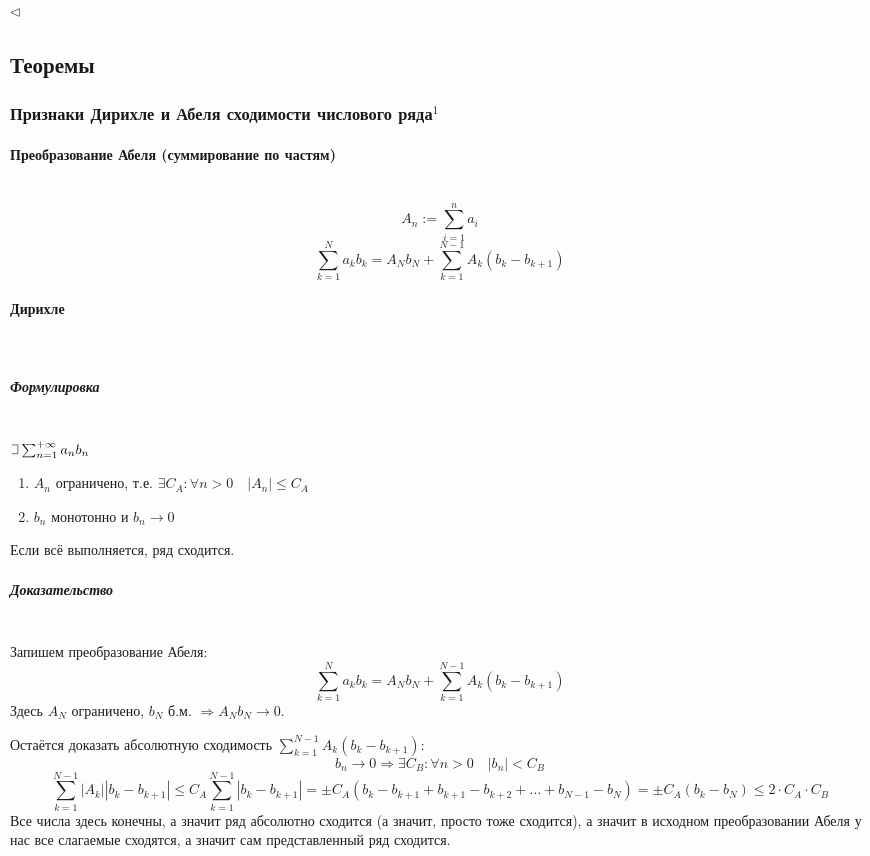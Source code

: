 \documentclass{article}
\def\letus{%
\mathord{\setbox0=\hbox{$\exists$}%
         \hbox{\kern 0.125\wd0%
               \vbox to \ht0{%
                  \hrule width 0.75\wd0%
                  \vfill%
                  \hrule width 0.75\wd0}%
               \vrule height \ht0%
               \kern 0.125\wd0}%
       }%
        }
\let\vanillaparagraph\paragraph
\let\vanillasubparagraph\subparagraph
\renewcommand{\paragraph}[1]{\vanillaparagraph{#1}\mbox{}\\}
\renewcommand{\subparagraph}[1]{\vanillasubparagraph{#1}\mbox{}\\}
\begin{document}
$\lhd$


\newpage
\subsection{Теоремы}

\subsubsection{Признаки Дирихле и Абеля сходимости числового ряда\texorpdfstring{$^1$}{}}
\paragraph{Преобразование Абеля (суммирование по частям)}
$$
A_n := \sum_{i=1}^n a_i
$$
$$
\sum_{k=1}^N a_k b_k = A_N b_N + \sum_{k=1}^{N-1} A_k (b_k - b_{k+1})
$$

\paragraph{Дирихле}
\subparagraph{Формулировка}
$\letus \sum_{n=1}^{+\infty} a_n b_n$
\begin{enumerate}
    \item $A_n$ ограничено, т.е. $\exists C_A : \forall n > 0 \quad |A_n| \le C_A$
    \item $b_n$ монотонно и $b_n \rightarrow 0$
\end{enumerate}
Если всё выполняется, ряд сходится. 

\subparagraph{Доказательство}
Запишем преобразование Абеля:
$$
\sum_{k=1}^N a_k b_k = A_N b_N + \sum_{k=1}^{N-1} A_k (b_k - b_{k+1})
$$
Здесь $A_N$ ограничено, $b_N$ б.м. $\Rightarrow A_N b_N \rightarrow 0$.

Остаётся доказать абсолютную сходимость $\sum_{k=1}^{N-1} A_k (b_k - b_{k+1})$:
$$
b_n \rightarrow 0 \Rightarrow \exists C_B : \forall n > 0 \quad |b_n| < C_B
$$
$$
\sum_{k=1}^{N-1} |A_k| |b_k - b_{k+1}| \le C_A \sum_{k=1}^{N-1} |b_k - b_{k+1}| = \pm C_A (b_k - b_{k+1} + b_{k+1} - b_{k+2} + \ldots + b_{N-1} - b_N) = \pm C_A (b_k - b_N) \le 2 \cdot C_A \cdot C_B
$$
Все числа здесь конечны, а значит ряд абсолютно сходится (а значит, просто тоже сходится), а значит в исходном преобразовании Абеля у нас все слагаемые сходятся, а значит сам представленный ряд сходится. 
\end{document}
